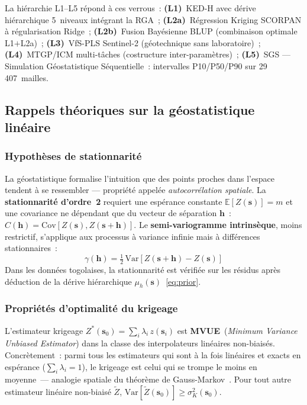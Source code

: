 \documentclass[10pt,a4paper,twocolumn]{article}
\newcommand{\bs}{\mathbf{s}}
\begin{document}
	La hiérarchie L1--L5 répond à ces verrous~:
	\textbf{(L1)}~KED-H avec dérive hiérarchique 5~niveaux intégrant la RGA~;
	\textbf{(L2a)}~Régression Kriging SCORPAN à régularisation Ridge~;
	\textbf{(L2b)}~Fusion Bayésienne BLUP (combinaison optimale L1$+$L2a)~;
	\textbf{(L3)}~VfS-PLS Sentinel-2 (géotechnique sans laboratoire)~;
	\textbf{(L4)}~MTGP/ICM multi-tâches (costructure inter-paramètres)~;
	\textbf{(L5)}~SGS --- Simulation Géostatistique Séquentielle~:
		intervalles P10/P50/P90 sur 29\,407~mailles.
	
	\subsection{Rappels théoriques sur la géostatistique linéaire}
	\label{sec:theorie}
	
	\subsubsection{Hypothèses de stationnarité}
	
	La géostatistique formalise l'intuition que des points proches dans
	l'espace tendent à se ressembler --- propriété appelée
	\emph{autocorrélation spatiale}.
	La \textbf{stationnarité d'ordre~2} requiert une espérance constante
	$\mathbb{E}[Z(\bs)]=m$ et une covariance ne dépendant que du vecteur
	de séparation $\mathbf{h}$~:
	$C(\mathbf{h})=\mathrm{Cov}[Z(\bs),Z(\bs+\mathbf{h})]$.
	Le \textbf{semi-variogramme intrinsèque}, moins restrictif, s'applique
	aux processus à variance infinie mais à différences stationnaires~:
	\begin{equation}
		\gamma(\mathbf{h})=\tfrac{1}{2}\,\mathrm{Var}
		[Z(\bs+\mathbf{h})-Z(\bs)]
		\label{eq:variogram}
	\end{equation}
	Dans les données togolaises, la stationnarité est vérifiée sur les
	résidus après déduction de la dérive hiérarchique
	$\mu_h(\bs)$~\eqref{eq:prior}.
	
	\subsubsection{Propriétés d'optimalité du krigeage}
	
	L'estimateur krigeage $Z^*(\bs_0)=\sum_i\lambda_i\,z(\bs_i)$ est
	\textbf{MVUE}~(\textit{Minimum Variance Unbiased Estimator}) dans la
	classe des interpolateurs linéaires non-biaisés.
	Concrètement~: parmi tous les estimateurs qui sont à la fois linéaires
	et exacts en espérance ($\sum_i\lambda_i=1$), le krigeage est celui
	qui se trompe le moins en moyenne~--- analogie spatiale du
	théorème de Gauss-Markov~\cite{chilesdelfiner2012}.
	Pour tout autre estimateur linéaire non-biaisé $\tilde{Z}$,
	$\mathrm{Var}[\tilde{Z}(\bs_0)]\geq\sigma^2_K(\bs_0)$.
	
\end{document}
